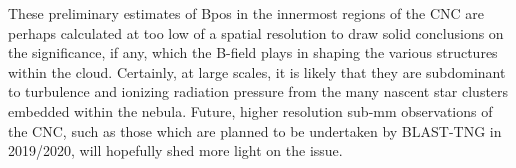 These preliminary estimates of \gls{Bpos} in the innermost regions of the CNC are perhaps calculated at too low of a spatial resolution to draw solid conclusions on the significance, if any, which the B-field plays in shaping the various structures within the cloud. Certainly, at large scales, it is likely that they are subdominant to turbulence and ionizing radiation pressure from the many nascent star clusters embedded within the nebula. Future, higher resolution sub-mm observations of the CNC, such as those which are planned to be undertaken by BLAST-TNG in 2019/2020, will hopefully shed more light on the issue.


